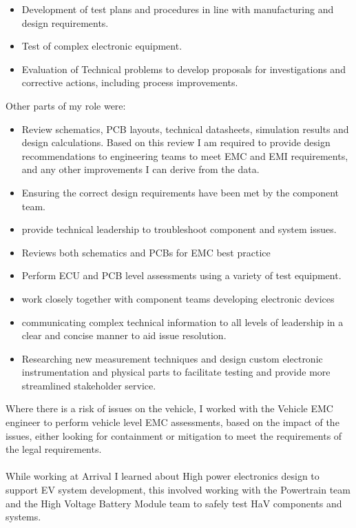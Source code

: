 {{{\begin{itemize}
	    \item Development of test plans and procedures in line with manufacturing and design requirements.
	    \item Test of complex electronic equipment.
	    \item Evaluation of Technical problems to develop proposals for investigations and corrective actions, including process improvements.
	\end{itemize}
Other parts of my role were:
	\begin{itemize}
	    \item Review schematics, PCB layouts, technical datasheets, simulation results and design calculations. Based on this review I am required to provide design recommendations to engineering teams to meet EMC and EMI requirements, and any other improvements I can derive from the data.
	    \item Ensuring the correct design requirements have been met by the component team.
	    \item provide technical leadership to troubleshoot component and system issues.
	    \item Reviews both schematics and PCBs for EMC best practice
	    \item Perform ECU and PCB level assessments using a variety of test equipment.
	    \item work closely together with component teams developing electronic devices
	    \item communicating complex technical information to all levels of leadership in a clear and concise manner to aid issue resolution.
	    \item Researching new measurement techniques and design custom electronic instrumentation and physical parts to facilitate testing and provide more streamlined stakeholder service.
	\end{itemize}
Where there is a risk of issues on the vehicle, I worked with the Vehicle EMC engineer to perform vehicle level EMC assessments, based on the impact of the issues, either looking for containment or mitigation to meet the requirements of the legal requirements.
\\
\\
While working at Arrival I learned about High power electronics design to support EV system development, this involved working with the Powertrain team and the High Voltage Battery Module team to safely test HaV components and systems.

}}}